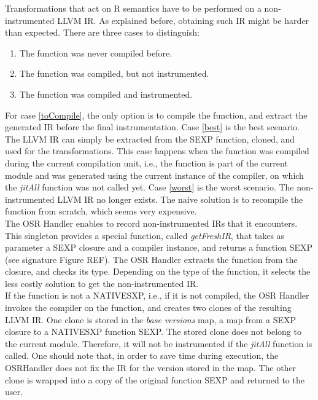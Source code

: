 Transformations that act on R semantics have to be performed on a non-instrumented LLVM IR.
As explained before, obtaining such IR might be harder than expected. 
There are three cases to distinguish:
\begin{enumerate}
    \item The function was never compiled before.\label{toCompile}
    \item The function was compiled, but not instrumented.\label{best} 
    \item The function was compiled and instrumented.\label{worst}
\end{enumerate}

For case \ref{toCompile}, the only option is to compile the function, and extract the generated IR before the final instrumentation.
Case \ref{best} is the best scenario.
The LLVM IR can simply be extracted from the SEXP function, cloned, and used for the transformations.
This case happens when the function was compiled during the current compilation unit, i.e., the function is part of the current module and was generated using the current instance of the compiler, on which the \textit{jitAll} function was not called yet.
Case \ref{worst} is the worst scenario.
The non-instrumented LLVM IR no longer exists.
The naive solution is to recompile the function from scratch, which seems very expensive.\\

The OSR Handler enables to record non-instrumented IRs that it encounters.
This singleton provides a special function, called \textit{getFreshIR}, that takes as parameter a SEXP closure and a compiler instance, and returns a function SEXP (see signature Figure REF).
The OSR Handler extracts the function from the closure, and checks its type.
Depending on the type of the function, it selects the less costly solution to get the non-instrumented IR.\\

If the function is not a NATIVESXP, i.e., if it is not compiled, the OSR Handler invokes the compiler on the function, and creates two clones of the resulting LLVM IR.
One clone is stored in the \textit{base versions} map, a map from a SEXP closure to a NATIVESXP function SEXP.
The stored clone does not belong to the current module.
Therefore, it will not be instrumented if the \textit{jitAll} function is called.
One should note that, in order to save time during execution, the OSRHandler does not fix the IR for the version stored in the map.
The other clone is wrapped into a copy of the original function SEXP and returned to the user.\\

